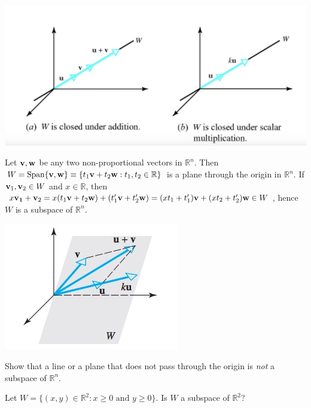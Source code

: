 \documentclass[12pt,letterpaper,reqno]{article}
\numberwithin{equation}{section}
\newcommand{\fixme}[1]{{\color{orange}{[#1]}}}
\begin{document}
\begin{center}
\includegraphics[scale=0.5]{figures_mvc/lines_through_origin}	
\end{center}

\begin{example}
Let ${\bf v}, {\bf w}$ be any two non-proportional vectors in $\mathbb{R}^n$. Then $W=\text{Span}\{{\bf v}, {\bf w}\}\equiv \{t_1{\bf v}+t_2{\bf w}:t_1,t_2 \in \mathbb{R}\}$ is a plane through the origin in $\mathbb{R}^n$. If ${\bf v}_1, {\bf v}_2 \in W$ and $x \in \mathbb{R}$, then $x{\bf v_1}+{\bf v}_2=x(t_1{\bf v}+t_2{\bf w})+(t_1'{\bf v}+t_2'{\bf w})=(xt_1+t_1'){\bf v}+(xt_2+t_2'){\bf w} \in W$, hence $W$ is a subspace of $\mathbb{R}^n$. \fixme{We have not introduced the span of a set of vectors yet.}	
\end{example}

\begin{center}
	\includegraphics[scale=0.5]{figures_mvc/plane_through_origin_subspace}
\end{center}

\begin{exercise}
Show that a line or a plane that does not pass through the origin is \emph{not} a subspace of $\mathbb{R}^n$.	
\end{exercise}

\begin{exercise}
Let $W=\{(x,y) \in \mathbb{R}^2 : x \geq 0 \text{ and }y \geq 0\}$. Is $W$ a subspace of $\mathbb{R}^2$?	
\end{exercise}
\end{document}
